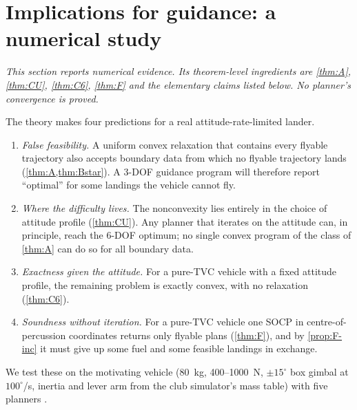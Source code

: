 \section{Implications for guidance: a numerical study}\label{sec:practice}
\emph{This section reports numerical evidence. Its theorem-level ingredients are \cref{thm:A}, \cref{thm:CU}, \cref{thm:C6},
\cref{thm:F} and the elementary claims listed below. No planner's convergence is proved.}

The theory makes four predictions for a real attitude-rate-limited lander.
\begin{enumerate}[leftmargin=*,itemsep=2pt,label=(P\arabic*)]
\item \emph{False feasibility.} A uniform convex relaxation that contains every flyable trajectory also accepts boundary data
from which no flyable trajectory lands (\cref{thm:A,thm:Bstar}). A 3-DOF guidance program will therefore report ``optimal'' for
some landings the vehicle cannot fly.
\item \emph{Where the difficulty lives.} The nonconvexity lies entirely in the choice of attitude profile (\cref{thm:CU}).
Any planner that iterates on the attitude can, in principle, reach the 6-DOF optimum; no single convex program of the class of
\cref{thm:A} can do so for all boundary data.
\item \emph{Exactness given the attitude.} For a pure-TVC vehicle with a fixed attitude profile, the remaining problem is exactly
convex, with no relaxation (\cref{thm:C6}).
\item \emph{Soundness without iteration.} For a pure-TVC vehicle one SOCP in centre-of-percussion coordinates returns only flyable
plans (\cref{thm:F}), and by \cref{prop:F-inc} it must give up some fuel and some feasible landings in exchange.
\end{enumerate}
We test these on the motivating vehicle (80~kg, 400--1000~N, $\pm15^\circ$ box gimbal at $100^\circ$/s, inertia and lever arm
from the club simulator's mass table) with five planners .

